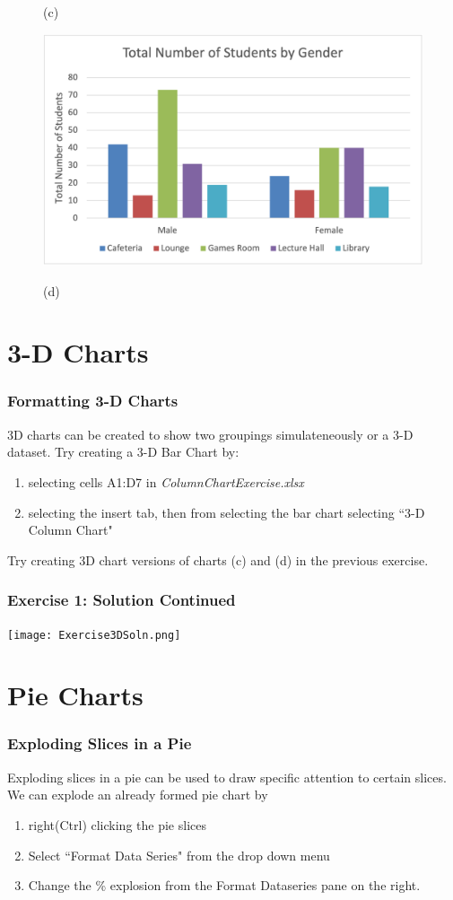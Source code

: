 \documentclass[12pt]{beamer}
\begin{document}
\begin{frame}
\begin{figure}[htb]
\begin{minipage}[t]{0.45\linewidth}
			\medskip
			\centerline{(c)}
		\end{minipage}
		\begin{minipage}[t]{0.45\linewidth}\centering
		\includegraphics[width=0.9\linewidth]{Exercise1ByGender.png}
		\medskip
		\centerline{(d)}
	\end{minipage}
	\end{figure}
\end{frame}
\section{3-D Charts}
	\begin{frame}
		\frametitle{Formatting 3-D Charts}
		3D charts can be created to show two groupings simulateneously or a 3-D dataset. 
		Try creating a 3-D  Bar Chart by:
		\begin{enumerate}
			\item selecting cells A1:D7 in \textit{ColumnChartExercise.xlsx}
			\item selecting the insert tab, then from selecting the bar chart selecting ``3-D Column Chart"
		\end{enumerate}
	Try creating 3D chart versions of charts (c) and (d) in the previous exercise.
	\end{frame}
\begin{frame}
	\frametitle{Exercise 1: Solution Continued}
	\begin{center}
		\texttt{[image: Exercise3DSoln.png]}
	\end{center}
\end{frame}

\section{Pie Charts}
\begin{frame}
	\frametitle{Exploding Slices in a Pie}
	Exploding slices in a pie can be used to draw specific attention to certain slices. We can explode an already formed pie chart by 
	\begin{enumerate}
		\item right(Ctrl) clicking the pie slices
		\item Select ``Format Data Series" from the drop down menu
		\item Change the \% explosion from the Format Dataseries pane on the right.
	\end{enumerate}
\end{frame}
\end{document}
